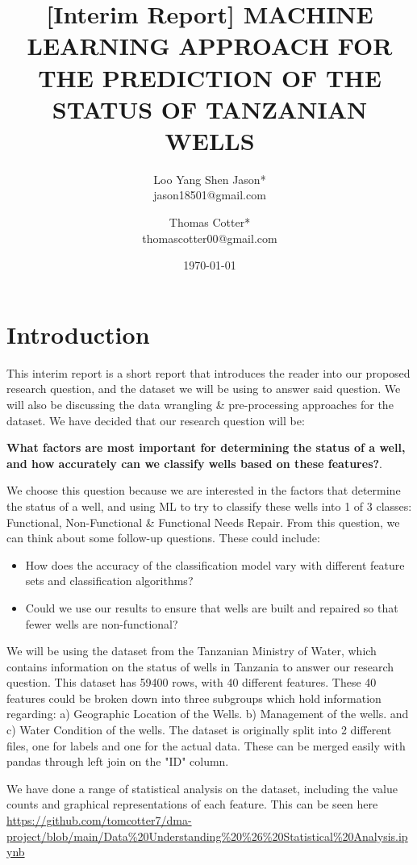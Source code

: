 \documentclass{article}
\title{[Interim Report] MACHINE LEARNING APPROACH FOR THE PREDICTION OF THE STATUS OF TANZANIAN WELLS}
\author{Loo Yang Shen Jason*\\
        jason18501@gmail.com \and Thomas Cotter*\\
        thomascotter00@gmail.com}
\date{\today}
\begin{document}
    
\maketitle

\section{Introduction}
\label{sec:intro}
This interim report is a short report that introduces the reader into our proposed research question, and the dataset we will be using to answer said question. We will also be discussing the data wrangling \& pre-processing approaches for the dataset. We have decided that our research question will be: 

\textbf{What factors are most important for determining the status of a well, and how accurately can we classify wells based on these features?}. 

We choose this question because we are interested in the factors that determine the status of a well, and using ML to try to classify these wells into 1 of 3 classes: Functional, Non-Functional \& Functional Needs Repair. From this question, we can think about some follow-up questions. These could include:
    \begin{itemize}
        \item How does the accuracy of the classification model vary with different feature sets and classification algorithms?
        \item Could we use our results to ensure that wells are built and repaired so that fewer wells are non-functional?
    \end{itemize}
 
We will be using the dataset from the Tanzanian Ministry of Water, which contains information on the status of wells in Tanzania to answer our research question. This dataset has 59400 rows, with 40 different features. These 40 features could be broken down into three subgroups which hold information regarding: a) Geographic Location of the Wells. b) Management of the wells. and c) Water Condition of the wells. The dataset is originally split into 2 different files, one for labels and one for the actual data. These can be merged easily with pandas through left join on the "ID" column. 



We have done a range of statistical analysis on the dataset, including the value counts and graphical representations of each feature. This can be seen here \url{https://github.com/tomcotter7/dma-project/blob/main/Data%20Understanding%20%26%20Statistical%20Analysis.ipynb}
\end{document}
